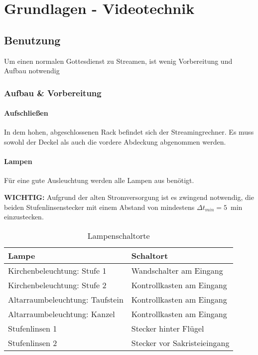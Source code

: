 \chapter{Grundlagen - Videotechnik}
	\section{Benutzung}
		Um einen normalen Gottesdienst zu Streamen, ist wenig Vorbereitung und Aufbau notwendig
		\subsection{Aufbau \& Vorbereitung}
			\subsubsection*{Aufschließen}
				In dem hohen, abgeschlossenen Rack befindet sich der Streamingrechner.
				Es muss sowohl der Deckel als auch die vordere Abdeckung abgenommen werden.
			\subsubsection*{Lampen}
				Für eine gute Ausleuchtung werden alle Lampen aus  benötigt.

				\textbf{WICHTIG:} Aufgrund der alten Stromversorgung ist es zwingend notwendig, die beiden Stufenlinsenstecker mit einem Abstand von mindestens $\varDelta t_{min} = \SI{5}{\min}$ einzustecken.

				\begin{table}[H]
					\caption{Lampenschaltorte}
					\label{table:grundlagen:video:aufbau:lampen}
					\centering

					\begin{tabular}{ll}
						\toprule
						\textbf{Lampe} & \textbf{Schaltort} \\
						\midrule
						Kirchenbeleuchtung: Stufe 1 & Wandschalter am Eingang \\
						Kirchenbeleuchtung: Stufe 2 & Kontrollkasten am Eingang \\
						Altarraumbeleuchtung: Taufstein & Kontrollkasten am Eingang \\
						Altarraumbeleuchtung: Kanzel & Kontrollkasten am Eingang\\
						Stufenlinsen 1 & Stecker hinter Flügel \\
						Stufenlinsen 2 & Stecker vor Sakristeieingang \\
						\bottomrule
					\end{tabular}
				\end{table}
